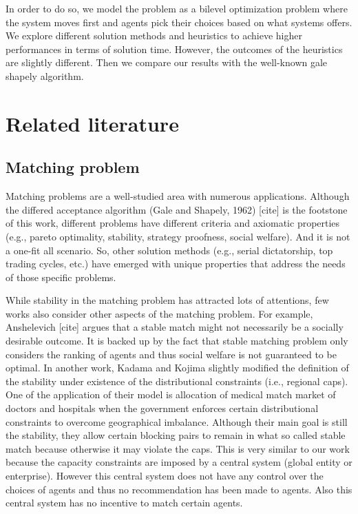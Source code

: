 \documentclass[11pt, letterpaper]{article}
\begin{document}
In order to do so, we model the problem as a bilevel optimization problem where the system moves first and agents pick their choices based on what systems offers. We explore different solution methods and heuristics to achieve higher performances in terms of solution time. However, the outcomes of the heuristics are slightly different. Then we compare our results with the well-known gale shapely algorithm.


\section{Related literature} \label {lit}
\subsection{Matching problem} 
Matching problems are a well-studied area with numerous applications. Although the differed acceptance algorithm (Gale and Shapely, 1962) [cite] is the footstone of this work, different problems have different criteria and axiomatic properties (e.g., pareto optimality, stability, strategy proofness, social welfare). And it is not a one-fit all scenario.  So, other solution methods (e.g., serial dictatorship, top trading cycles, etc.) have emerged with unique properties that address the needs of those specific problems. 

While stability in the matching problem has attracted lots of attentions, few works also consider other aspects of the matching problem. For example, Anshelevich  [cite] argues that a stable match might not necessarily be a socially desirable outcome. It is backed up by the fact that stable matching problem only considers the ranking of agents and thus social welfare is not guaranteed to be optimal. In another work, Kadama and Kojima  slightly modified the definition of the stability under existence of the distributional constraints (i.e., regional caps). One of the application of their model is allocation of medical match market of doctors and hospitals when the government enforces certain distributional constraints to overcome geographical imbalance. Although their main goal is still the stability, they allow certain blocking pairs to remain in what so called stable match because otherwise it may violate the caps. This is very similar to our work because the capacity constraints are imposed by a central system (global entity or enterprise). However this central system does not have any control over the choices of agents and thus no recommendation has been made to agents. Also this central system has no incentive to match certain agents. 
\end{document}
